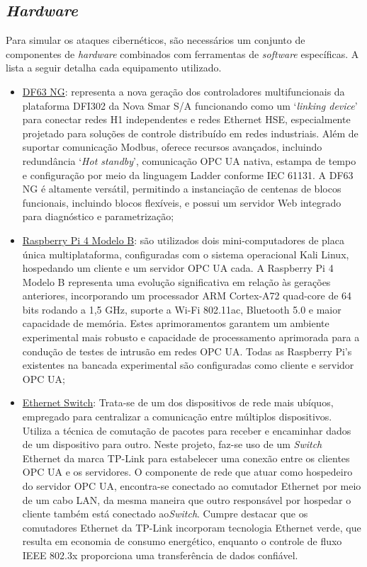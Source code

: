     \subsection{\textit{Hardware}}

    Para simular os ataques cibernéticos, são necessários um conjunto de componentes de \textit{hardware} combinados com ferramentas de \textit{software} específicas. A lista a seguir detalha cada equipamento utilizado.

    \begin{itemize}
        \item \underline{DF63 NG}: representa a nova geração dos controladores multifuncionais da plataforma DFI302 da Nova Smar S/A funcionando como um `\textit{linking device}' para conectar redes H1 independentes e redes Ethernet HSE, especialmente projetado para soluções de controle distribuído em redes industriais. Além de suportar comunicação Modbus, oferece recursos avançados, incluindo redundância `\textit{Hot standby}', comunicação OPC UA nativa, estampa de tempo e configuração por meio da linguagem Ladder conforme IEC 61131. A DF63 NG é altamente versátil, permitindo a instanciação de centenas de blocos funcionais, incluindo blocos flexíveis, e possui um servidor Web integrado para diagnóstico e parametrização;
        \item \underline{Raspberry Pi 4 Modelo B}: são utilizados dois mini-computadores de placa única multiplataforma, configuradas com o sistema operacional Kali Linux, hospedando um cliente e um servidor OPC UA cada. A Raspberry Pi 4 Modelo B representa uma evolução significativa em relação às gerações anteriores, incorporando um processador ARM Cortex-A72 quad-core de 64 bits rodando a 1,5 GHz, suporte a Wi-Fi 802.11ac, Bluetooth 5.0 e maior capacidade de memória. Estes aprimoramentos garantem um ambiente experimental mais robusto e capacidade de processamento aprimorada para a condução de testes de intrusão em redes OPC UA. Todas as Raspberry Pi's existentes na bancada experimental são configuradas como cliente e servidor OPC UA;
        \item \underline{Ethernet Switch}: Trata-se de um dos dispositivos de rede mais ubíquos, empregado para centralizar a comunicação entre múltiplos dispositivos. Utiliza a técnica de comutação de pacotes para receber e encaminhar dados de um dispositivo para outro. Neste projeto, faz-se uso de um \textit{Switch} Ethernet da marca TP-Link para estabelecer uma conexão entre os clientes OPC UA e os servidores. O componente de rede que atuar como hospedeiro do servidor OPC UA, encontra-se conectado ao comutador Ethernet por meio de um cabo LAN, da mesma maneira que outro responsável por hospedar o cliente também está conectado ao\textit{Switch}. Cumpre destacar que os comutadores Ethernet da TP-Link incorporam tecnologia Ethernet verde, que resulta em economia de consumo energético, enquanto o controle de fluxo IEEE 802.3x proporciona uma transferência de dados confiável.

\end{itemize}

